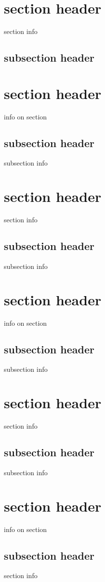 \documentclass{project}
\begin{document}
\section{section header}
section info
\subsection{subsection header}


\section{section header}
info on section
\subsection{subsection header}
subsection info
\section{section header}
section info
\subsection{subsection header}
subsection info

\section{section header}
info on section
\subsection{subsection header}
subsection info

\section{section header}
section info
\subsection{subsection header}
subsection info

\section{section header}
info on section
\subsection{subsection header}
section info
\end{document}

